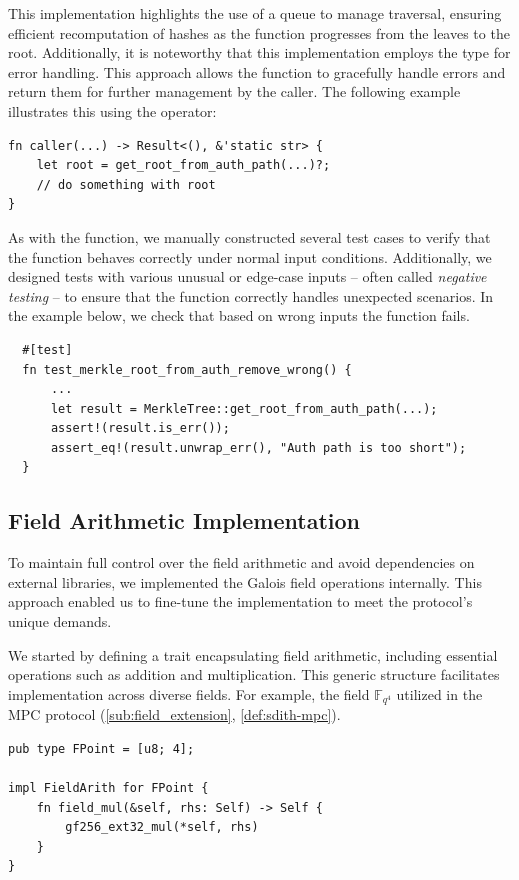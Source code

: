 \documentclass[11pt]{report}
\theoremstyle{definition}
\theoremstyle{plain}
\begin{document}
This implementation highlights the use of a queue to manage traversal, ensuring efficient recomputation of hashes as the function progresses from the leaves to the root. Additionally, it is noteworthy that this implementation employs the  type for error handling. This approach allows the function to gracefully handle errors and return them for further management by the caller. The following example illustrates this using the  operator:

\begin{verbatim}
fn caller(...) -> Result<(), &'static str> {
    let root = get_root_from_auth_path(...)?;
    // do something with root
}
\end{verbatim}

As with the  function, we manually constructed several test cases to verify that the function behaves correctly under normal input conditions. Additionally, we designed tests with various unusual or edge-case inputs -- often called \textit{negative testing} -- to ensure that the function correctly handles unexpected scenarios. In the example below, we check that based on wrong inputs the function fails.

\begin{verbatim}
  #[test]
  fn test_merkle_root_from_auth_remove_wrong() {
      ...
      let result = MerkleTree::get_root_from_auth_path(...);
      assert!(result.is_err());
      assert_eq!(result.unwrap_err(), "Auth path is too short");
  }
\end{verbatim}

\subsection{Field Arithmetic Implementation}\label{sub:field_arithmetic}
To maintain full control over the field arithmetic and avoid dependencies on external libraries,
we implemented the Galois field operations internally. This approach enabled us to fine-tune the implementation
to meet the protocol's unique demands.

We started by defining a  trait encapsulating field arithmetic, including essential operations such as addition and multiplication. This generic structure facilitates implementation across diverse fields. For example, the field $\mathbb{F}_{q^4}$ utilized in the MPC protocol (\autoref{sub:field_extension}, \autoref{def:sdith-mpc}).

\begin{verbatim}
pub type FPoint = [u8; 4];

impl FieldArith for FPoint {
    fn field_mul(&self, rhs: Self) -> Self {
        gf256_ext32_mul(*self, rhs)
    }
}
\end{verbatim}
\end{document}
